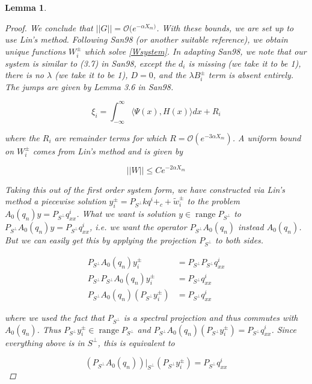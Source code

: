 \documentclass[12pt]{article}
\DeclareMathOperator{\ran}{range}
\newtheorem{lemma}{Lemma}
\begin{document}
\begin{lemma}
\begin{proof}
We conclude that $||G|| = \mathcal{O}(e^{-\alpha X_m)}$. With these bounds, we are set up to use Lin's method. Following San98 (or another suitable reference), we obtain unique functions $W_i^\pm$ which solve \eqref{Wsystem}. In adapting San98, we note that our system is similar to (3.7) in San98, except the $d_i$ is missing (we take it to be 1), there is no $\lambda$ (we take it to be 1), $D = 0$, and the $\lambda B_i^\pm$ term is absent entirely. The jumps are given by Lemma 3.6 in San98.

\begin{equation}
\xi_i = \int_{-\infty}^\infty \langle \Psi(x), H(x) \rangle dx + R_i
\end{equation}

where the $R_i$ are remainder terms for which $R = \mathcal{O}(e^{-3 \alpha X_m})$. A uniform bound on $W_i^\pm$ comes from Lin's method and is given by 

\begin{equation}\label{Wbound}
||W|| \leq C e^{-2 \alpha X_m}
\end{equation}

Taking this out of the first order system form, we have constructed via Lin's method a piecewise solution $y_i^\pm = P_{S^\perp} k q^i+_c + \tilde{w}_i^\pm$ to the problem $A_0(q_n) y = P_{S^\perp} q^i_{xx}$. What we want is solution $y \in \ran P_{S^\perp}$ to $P_{S^\perp} A_0(q_n) y = P_{S^\perp} q^i_{xx}$, i.e. we want the operator $P_{S^\perp} A_0(q_n)$ instead $A_0(q_n)$. But we can easily get this by applying the projection $P_{S^\perp}$ to both sides.

\begin{align*}
P_{S^\perp} A_0(q_n) y_i^\pm &= P_{S^\perp} P_{S^\perp} q^i_{xx} \\
P_{S^\perp} P_{S^\perp} A_0(q_n) y_i^\pm &= P_{S^\perp} q^i_{xx} \\
P_{S^\perp} A_0(q_n) (P_{S^\perp} y_i^\pm) &= P_{S^\perp} q^i_{xx}
\end{align*}

where we used the fact that $P_{S^\perp}$ is a spectral projection and thus commutes with $A_0(q_n)$. Thus $P_{S^\perp} y_i^\pm \in \ran P_{S^\perp}$ and $P_{S^\perp} A_0(q_n) (P_{S^\perp} y_i^\pm) = P_{S^\perp} q^i_{xx}$. Since everything above is in $S^\perp$, this is equivalent to

\begin{equation}
(P_{S^\perp} A_0(q_n))|_{S^\perp} (P_{S^\perp} y_i^\pm) = P_{S^\perp} q^i_{xx}
\end{equation}


\end{proof}
\end{lemma}
\end{document}
